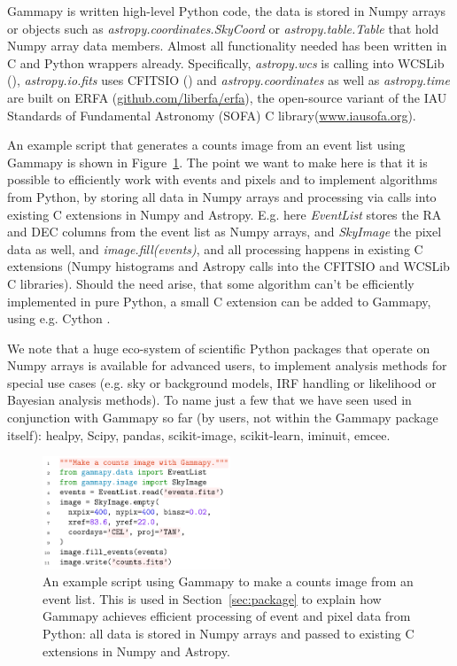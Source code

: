 \documentclass{PoS}
\newcommand{\urlErfa}{\href{https://github.com/liberfa/erfa}{github.com/liberfa/erfa}}
\newcommand{\urlSofa}{\href{http://www.iausofa.org}{www.iausofa.org}}
\begin{document}
Gammapy is written high-level Python code, the data is stored in Numpy arrays or
objects such as {\it astropy.coordinates.SkyCoord} or {\it astropy.table.Table}
that hold Numpy array data members. Almost all functionality needed has been
written in C and Python wrappers already. Specifically, {\it astropy.wcs} is
calling into WCSLib (\cite{wcslib}), {\it astropy.io.fits} uses CFITSIO
(\cite{cfitsio}) and {\it astropy.coordinates} as well as {\it astropy.time} are
built on ERFA (\urlErfa), the open-source variant of the IAU Standards of
Fundamental Astronomy (SOFA) C library\linebreak (\urlSofa).

An example script that generates a counts image from an event list using Gammapy
is shown in Figure~\ref{fig:code_example}. The point we want to
make here is that it is possible to efficiently work with events and pixels and
to implement algorithms from Python, by storing all data in Numpy arrays and
processing via calls into existing C extensions in Numpy and Astropy. E.g. here
{\it EventList} stores the RA and DEC columns from the event list as Numpy
arrays, and {\it SkyImage} the pixel data as well, and {\it image.fill(events)},
and all processing happens in existing C extensions (Numpy histograms and
Astropy calls into the CFITSIO and WCSLib C libraries). Should the need arise,
that some algorithm can't be efficiently implemented in pure Python, a small C
extension can be added to Gammapy, using e.g. Cython \cite{cython}.

We note that a huge eco-system of scientific Python packages that operate on
Numpy arrays is available for advanced users, to implement analysis methods for
special use cases (e.g. sky or background models, IRF handling or likelihood or
Bayesian analysis methods). To name just a few that we have seen used in
conjunction with Gammapy so far (by users, not within the Gammapy package
itself): healpy, Scipy, pandas, scikit-image, scikit-learn, iminuit, emcee.

\begin{figure}[t]
\centering
\includegraphics[width=0.5\textwidth]{examples/code_events_image}
\caption{
An example script using Gammapy to make a counts image from an event list. This
is used in Section~\ref{sec:package} to explain how Gammapy achieves efficient
processing of event and pixel data from Python: all data is stored in Numpy
arrays and passed to existing C extensions in Numpy and Astropy.
}
\label{fig:code_example}
\end{figure}
\end{document}
